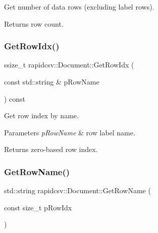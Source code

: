 Get number of data rows (excluding label rows). 

\begin{DoxyReturn}{Returns}
row count. 
\end{DoxyReturn}
\mbox{\label{classrapidcsv_1_1Document_a9c0d1a978bb9b764d13722219b0f4886}} 
\subsubsection{\texorpdfstring{Get\+Row\+Idx()}{GetRowIdx()}}
{\footnotesize\ttfamily ssize\+\_\+t rapidcsv\+::\+Document\+::\+Get\+Row\+Idx (\begin{DoxyParamCaption}\item[{const std\+::string \&}]{p\+Row\+Name }\end{DoxyParamCaption}) const\hspace{0.3cm}{\ttfamily [inline]}}



Get row index by name. 


\begin{DoxyParams}{Parameters}
{\em p\+Row\+Name} & row label name. \\
\hline
\end{DoxyParams}
\begin{DoxyReturn}{Returns}
zero-\/based row index. 
\end{DoxyReturn}
\mbox{\label{classrapidcsv_1_1Document_aa3b25e906bf2ad2ca01a969a6e60eca3}} 
\subsubsection{\texorpdfstring{Get\+Row\+Name()}{GetRowName()}}
{\footnotesize\ttfamily std\+::string rapidcsv\+::\+Document\+::\+Get\+Row\+Name (\begin{DoxyParamCaption}\item[{const size\+\_\+t}]{p\+Row\+Idx }\end{DoxyParamCaption})\hspace{0.3cm}{\ttfamily [inline]}}



